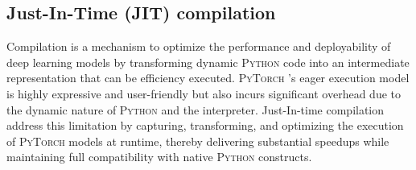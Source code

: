 \subsection{Just-In-Time (JIT) compilation}

Compilation is a mechanism to optimize the performance and deployability of deep learning models by transforming dynamic \textsc{Python} code into an intermediate representation that can be efficiency executed. 
\textsc{PyTorch} \cite{pytorch}'s eager execution model is highly expressive and user-friendly but also incurs significant overhead due to the dynamic nature of \textsc{Python} and the interpreter. 
Just-In-time compilation address this limitation by capturing, transforming, and optimizing the execution of \textsc{PyTorch} models at runtime, thereby delivering substantial speedups while maintaining full compatibility with native \textsc{Python} constructs.

